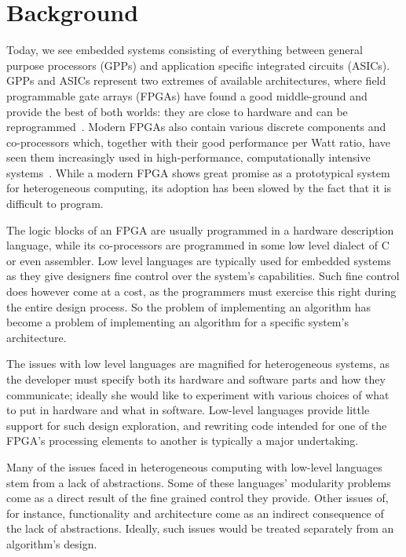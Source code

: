 \documentclass[../paper.tex]{subfiles}
\begin{document}
\chapter{Background}
\label{background}

Today, we see embedded systems consisting of everything between general purpose processors (GPPs) and application specific integrated circuits (ASICs). GPPs and ASICs represent two extremes of available architectures, where field programmable gate arrays (FPGAs) have found a good middle-ground and provide the best of both worlds: they are close to hardware and can be reprogrammed~\cite{bacon2013}. Modern FPGAs also contain various discrete components and co-processors which, together with their good performance per Watt ratio, have seen them increasingly used in high-performance, computationally intensive systems~\cite{mcmillan2014}. While a modern FPGA shows great promise as a prototypical system for heterogeneous computing, its adoption has been slowed by the fact that it is difficult to program.

The logic blocks of an FPGA are usually programmed in a hardware description language, while its co-processors are programmed in some low level dialect of C or even assembler. Low level languages are typically used for embedded systems as they give designers fine control over the system's capabilities. Such fine control does however come at a cost, as the programmers must exercise this right during the entire design process. So the problem of implementing an algorithm has become a problem of implementing an algorithm for a specific system's architecture.

The issues with low level languages are magnified for heterogeneous systems, as the developer must specify both its hardware and software parts and how they communicate; ideally she would like to experiment with various choices of what to put in hardware and what in software. Low-level languages provide little support for such design exploration, and rewriting code intended for one of the FPGA's processing elements to another is typically a major undertaking.

Many of the issues faced in heterogeneous computing with low-level languages stem from a lack of abstractions. Some of these languages' modularity problems come as a direct result of the fine grained control they provide. Other issues of, for instance, functionality and architecture come as an indirect consequence of the lack of abstractions. Ideally, such issues would be treated separately from an algorithm's design.
\end{document}
